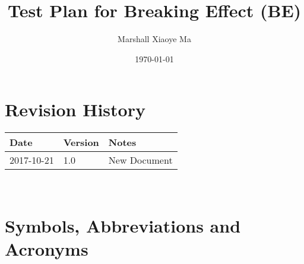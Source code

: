 \documentclass[12pt, titlepage]{article}
\begin{document}
	
	\title{Test Plan for Breaking Effect (BE)} 
	\author{Marshall Xiaoye Ma}
	\date{\today}
	
	\maketitle
	
	
	\section{Revision History}
	
	\begin{tabularx}{\textwidth}{p{3cm}p{2cm}X}
		\toprule {\bf Date} & {\bf Version} & {\bf Notes}\\
		\midrule
		2017-10-21 & 1.0 & New Document\\
		\bottomrule
	\end{tabularx}
	
	~\newpage
	
	\section{Symbols, Abbreviations and Acronyms}
	
\end{document}
